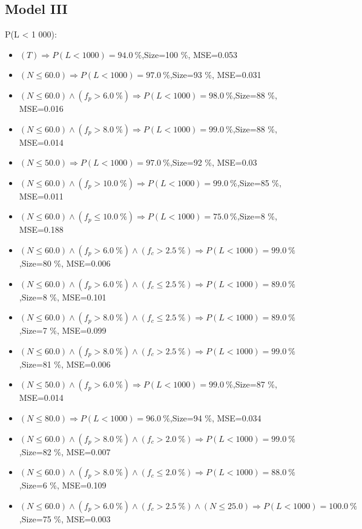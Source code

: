 \documentclass[numbered]{CSL}
\begin{document}
\subsection{Model III}
P(L < 1 000):
\begin{itemize}
\item $(T) \Rightarrow P(L < 1 000) = 94.0~\%$,\hfill Size=100 \%, MSE=0.053
\item $(N \leq 60.0) \Rightarrow P(L < 1 000) = 97.0~\%$,\hfill Size=93 \%, MSE=0.031
\item $(N \leq 60.0) \land (f_p > 6.0~\%) \Rightarrow P(L < 1 000) = 98.0~\%$,\hfill Size=88 \%, MSE=0.016
\item $(N \leq 60.0) \land (f_p > 8.0~\%) \Rightarrow P(L < 1 000) = 99.0~\%$,\hfill Size=88 \%, MSE=0.014
\item $(N \leq 50.0) \Rightarrow P(L < 1 000) = 97.0~\%$,\hfill Size=92 \%, MSE=0.03
\item $(N \leq 60.0) \land (f_p > 10.0~\%) \Rightarrow P(L < 1 000) = 99.0~\%$,\hfill Size=85 \%, MSE=0.011
\item $(N \leq 60.0) \land (f_p \leq 10.0~\%) \Rightarrow P(L < 1 000) = 75.0~\%$,\hfill Size=8 \%, MSE=0.188
\item $(N \leq 60.0) \land (f_p > 6.0~\%) \land (f_c > 2.5~\%) \Rightarrow P(L < 1 000) = 99.0~\%$,\hfill Size=80 \%, MSE=0.006
\item $(N \leq 60.0) \land (f_p > 6.0~\%) \land (f_c \leq 2.5~\%) \Rightarrow P(L < 1 000) = 89.0~\%$,\hfill Size=8 \%, MSE=0.101
\item $(N \leq 60.0) \land (f_p > 8.0~\%) \land (f_c \leq 2.5~\%) \Rightarrow P(L < 1 000) = 89.0~\%$,\hfill Size=7 \%, MSE=0.099
\item $(N \leq 60.0) \land (f_p > 8.0~\%) \land (f_c > 2.5~\%) \Rightarrow P(L < 1 000) = 99.0~\%$,\hfill Size=81 \%, MSE=0.006
\item $(N \leq 50.0) \land (f_p > 6.0~\%) \Rightarrow P(L < 1 000) = 99.0~\%$,\hfill Size=87 \%, MSE=0.014
\item $(N \leq 80.0) \Rightarrow P(L < 1 000) = 96.0~\%$,\hfill Size=94 \%, MSE=0.034
\item $(N \leq 60.0) \land (f_p > 8.0~\%) \land (f_c > 2.0~\%) \Rightarrow P(L < 1 000) = 99.0~\%$,\hfill Size=82 \%, MSE=0.007
\item $(N \leq 60.0) \land (f_p > 8.0~\%) \land (f_c \leq 2.0~\%) \Rightarrow P(L < 1 000) = 88.0~\%$,\hfill Size=6 \%, MSE=0.109
\item $(N \leq 60.0) \land (f_p > 6.0~\%) \land (f_c > 2.5~\%) \land (N \leq 25.0) \Rightarrow P(L < 1 000) = 100.0~\%$,\hfill Size=75 \%, MSE=0.003

\end{itemize}
\end{document}
